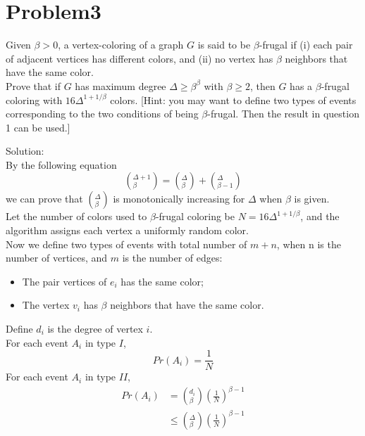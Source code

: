 \documentclass[12pt]{article}
\begin{document}
\section{Problem3}
Given $\beta > 0$, a vertex-coloring of a graph $G$ is said to be $\beta$-frugal if (i) each pair of adjacent vertices has different colors, and (ii) no vertex has $\beta$ neighbors that have the same color.\\
Prove that if $G$ has maximum degree $\Delta \ge \beta^\beta$ with $\beta \ge 2$, then $G$ has a $\beta$-frugal coloring with $16\Delta^{1+1/\beta}$ colors. [Hint: you may want to define two types of events corresponding to the two conditions of being $\beta$-frugal. Then the result in question 1 can be used.]

Solution:\\

By the following equation
\begin{equation}
    ({}_\beta^{\Delta+1}) = ({}_\beta^\Delta)+({}_{\beta-1}^{\Delta})
\end{equation}
we can prove that $({}_\beta^\Delta)$ is monotonically increasing for $\Delta$ when $\beta$ is given.\\
Let the number of colors used to $\beta$-frugal coloring be $N=16\Delta^{1+1/\beta}$, and the algorithm assigns each vertex a uniformly random color.\\
Now we define two types of events with total number of $m + n$, when n is the number of vertices, and $m$ is the number of edges:
\begin{itemize}
    \item The pair vertices of $e_i$ has the same color;
    \item The vertex $v_i$ has $\beta$ neighbors that have the same color.
\end{itemize}
Define $d_i$ is the degree of vertex $i$.\\
For each event $A_i$ in type $I$,
\begin{equation}
    Pr(A_i)=\frac{1}{N}
\end{equation}
For each event $A_i$ in type $II$,
\begin{equation}
    \begin{split}
    Pr(A_i) &= ({}^{d_i}_\beta) (\frac{1}{N})^{\beta-1}\\
    &\le ({}^\Delta_\beta) (\frac{1}{N})^{\beta-1}
    \end{split}
\end{equation}
\end{document}
